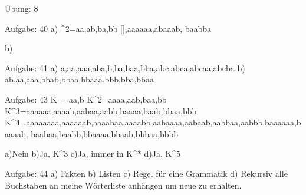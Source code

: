 Übung: 8

Aufgabe: 40
a)
\sum^2={aa,ab,ba,bb}
[],aaaaaa,abaaab, baabba

b)


Aufgabe: 41
a) {a,aa,aaa,aba,b,ba,baa,bba,abc,abca,abcaa,abcba}
b) {ab,aa,aaa,bbab,bbaa,bbaaa,bbb,bba,bbaa}


Aufgabe: 43
K = {aa,b}
K^2={aaaa,aab,baa,bb}
K^3={aaaaaa,aaaab,aabaa,aabb,baaaa,baab,bbaa,bbb}
K^4={aaaaaaaa,aaaaaab,aaaabaa,aaaabb,aabaaaa,aabaab,aabbaa,aabbb,baaaaaa,baaaab,
	baabaa,baabb,bbaaaa,bbaab,bbbaa,bbbb}

a)Nein
b)Ja, K^3
c)Ja, immer in K^*
d)Ja, K^5


Aufgabe: 44
a) Fakten
b) Listen
c) Regel für eine Grammatik
d) Rekursiv alle Buchstaben an meine Wörterliste anhängen um neue zu erhalten.